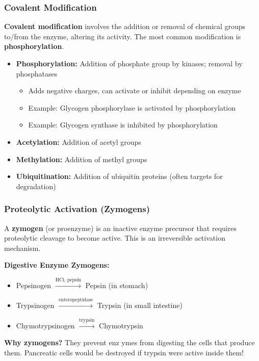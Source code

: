 \subsubsection{Covalent Modification}

\begin{definition}
\textbf{Covalent modification} involves the addition or removal of chemical groups to/from the enzyme, altering its activity. The most common modification is \textbf{phosphorylation}.
\end{definition}

\begin{itemize}
    \item \textbf{Phosphorylation:} Addition of phosphate group by kinases; removal by phosphatases
    \begin{itemize}
        \item Adds negative charges, can activate or inhibit depending on enzyme
        \item Example: Glycogen phosphorylase is activated by phosphorylation
        \item Example: Glycogen synthase is inhibited by phosphorylation
    \end{itemize}
    \item \textbf{Acetylation:} Addition of acetyl groups
    \item \textbf{Methylation:} Addition of methyl groups
    \item \textbf{Ubiquitination:} Addition of ubiquitin proteins (often targets for degradation)
\end{itemize}

\subsubsection{Proteolytic Activation (Zymogens)}

\begin{definition}
A \textbf{zymogen} (or proenzyme) is an inactive enzyme precursor that requires proteolytic cleavage to become active. This is an irreversible activation mechanism.
\end{definition}

\begin{example}
\textbf{Digestive Enzyme Zymogens:}
\begin{itemize}
    \item Pepsinogen $\xrightarrow{\text{HCl, pepsin}}$ Pepsin (in stomach)
    \item Trypsinogen $\xrightarrow{\text{enteropeptidase}}$ Trypsin (in small intestine)
    \item Chymotrypsinogen $\xrightarrow{\text{trypsin}}$ Chymotrypsin
\end{itemize}

\textbf{Why zymogens?} They prevent enz
ymes from digesting the cells that produce them. Pancreatic cells would be destroyed if trypsin were active inside them!
\end{example}

